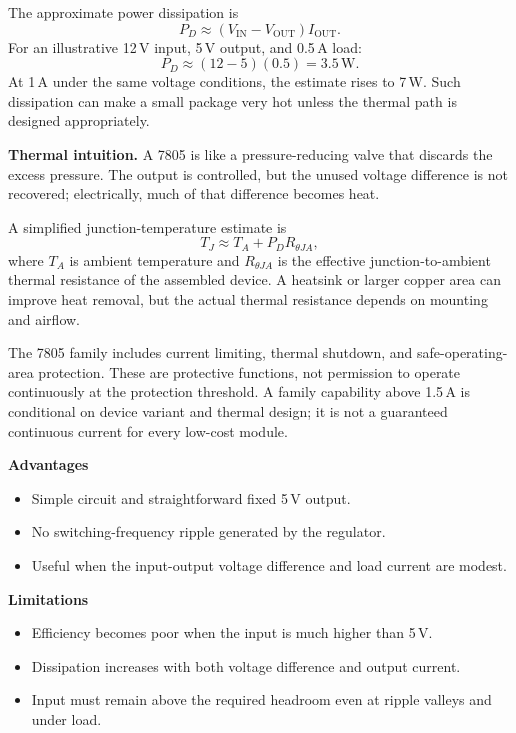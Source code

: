 \documentclass[journal,12pt,twocolumn]{IEEEtran}
\begin{document}
The approximate power dissipation is
\begin{equation}
    \boxed{P_D\approx(V_{\mathrm{IN}}-V_{\mathrm{OUT}})I_{\mathrm{OUT}}.}
    \label{eq:7805-loss}
\end{equation}
For an illustrative 12\,V input, 5\,V output, and 0.5\,A load:
\begin{equation}
    P_D\approx(12-5)(0.5)=3.5\,\mathrm{W}.
\end{equation}
At 1\,A under the same voltage conditions, the estimate rises to
7\,W. Such dissipation can make a small package very hot unless
the thermal path is designed appropriately.

\textbf{Thermal intuition.} A 7805 is like a pressure-reducing valve
that discards the excess pressure. The output is controlled, but
the unused voltage difference is not recovered; electrically, much
of that difference becomes heat.

A simplified junction-temperature estimate is
\begin{equation}
    \boxed{T_J\approx T_A+P_D R_{\theta JA},}
    \label{eq:thermal}
\end{equation}
where $T_A$ is ambient temperature and $R_{\theta JA}$ is the
effective junction-to-ambient thermal resistance of the assembled
device. A heatsink or larger copper area can improve heat removal,
but the actual thermal resistance depends on mounting and airflow.

The 7805 family includes current limiting, thermal shutdown, and
safe-operating-area protection. These are protective functions,
not permission to operate continuously at the protection threshold.
A family capability above 1.5\,A is conditional on device variant
and thermal design; it is not a guaranteed continuous current for
every low-cost module.

\textbf{Advantages}
\begin{itemize}[leftmargin=1.5em]
    \item Simple circuit and straightforward fixed 5\,V output.
    \item No switching-frequency ripple generated by the regulator.
    \item Useful when the input-output voltage difference and load
    current are modest.
\end{itemize}
\textbf{Limitations}
\begin{itemize}[leftmargin=1.5em]
    \item Efficiency becomes poor when the input is much higher
    than 5\,V.
    \item Dissipation increases with both voltage difference and
    output current.
    \item Input must remain above the required headroom even at
    ripple valleys and under load.
\end{itemize}
\end{document}
